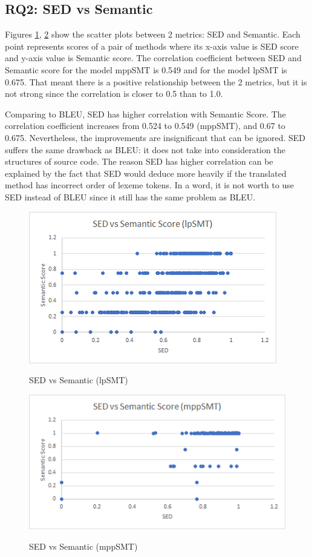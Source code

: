 \subsection{RQ2: SED vs Semantic}
Figures \ref{fig:SedSemlpSMT}, \ref{fig:SedSemMppSMT}  show the scatter plots between 2 metrics: SED and Semantic. Each point represents scores of a pair of methods where its x-axis value is SED score and y-axis value is Semantic score.
The correlation coefficient between SED and Semantic score for the model mppSMT is 0.549 and for the model lpSMT is 0.675. That meant there is a positive relationship between the 2 metrics, but it is not strong since the correlation is closer to 0.5 than to 1.0.

Comparing to BLEU, SED has higher correlation with Semantic Score. The correlation coefficient increases from 0.524 to 0.549 (mppSMT), and 0.67 to 0.675. Nevertheless, the improvements are insignificant that can be ignored. SED suffers the same drawback as BLEU: it does not take into consideration the structures of source code. The reason SED has higher correlation can be explained by the fact that SED would deduce more heavily if the translated method has incorrect order of lexeme tokens. In a word, it is not worth to use SED instead of BLEU since it still has the same problem as BLEU. 

\begin{figure}
\caption{SED vs Semantic (lpSMT)}
\centering
\includegraphics{img/sedvssem_lpSMT.png}
\label{fig:SedSemlpSMT}
\end{figure}

\begin{figure}
\caption{SED vs Semantic (mppSMT)}
\centering
\includegraphics{img/sedvssem_mppSMT.png}
\label{fig:SedSemMppSMT}
\end{figure}

